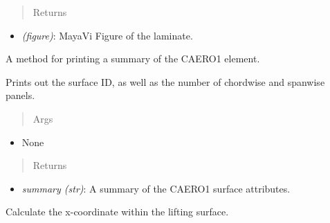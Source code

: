 \documentclass[letterpaper,10pt,english]{sphinxmanual}
\begin{document}
\begin{fulllineitems}
\begin{fulllineitems}
\begin{itemize}
\end{itemize}
\begin{quote}\begin{description}
\item[{Returns}] \leavevmode
\end{description}\end{quote}
\begin{itemize}
\item {} 
\emph{(figure)}: MayaVi Figure of the laminate.

\end{itemize}

\end{fulllineitems}


\begin{fulllineitems}
\label{aerodynamics:AeroComBAT.Aerodynamics.CAERO1.printSummary}
A method for printing a summary of the CAERO1 element.

Prints out the surface ID, as well as the number of chordwise and
spanwise panels.
\begin{quote}\begin{description}
\item[{Args}] \leavevmode
\end{description}\end{quote}
\begin{itemize}
\item {} 
None

\end{itemize}
\begin{quote}\begin{description}
\item[{Returns}] \leavevmode
\end{description}\end{quote}
\begin{itemize}
\item {} 
\emph{summary (str)}: A summary of the CAERO1 surface attributes.

\end{itemize}

\end{fulllineitems}


\begin{fulllineitems}
\label{aerodynamics:AeroComBAT.Aerodynamics.CAERO1.x}
Calculate the x-coordinate within the lifting surface.


\end{fulllineitems}
\end{fulllineitems}
\end{document}
